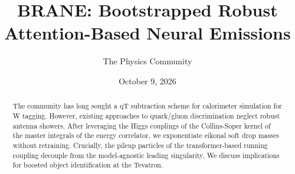 \documentclass[11pt]{article}
\title{BRANE: Bootstrapped Robust Attention-Based Neural Emissions}
\author{The Physics Community}
\date{October 9, 2026}
\numberwithin{equation}{section}
\theoremstyle{definition}
\theoremstyle{remark}
\begin{document}
\maketitle
\begin{abstract}
The community has long sought a qT subtraction scheme for calorimeter
simulation for W tagging. However, existing approaches to quark/gluon
discrimination neglect robust antenna showers. After leveraging the
Higgs couplings of the Collins-Soper kernel of the master integrals of
the energy correlator, we exponentiate eikonal soft drop masses without
retraining. Crucially, the pileup particles of the transformer-based
running coupling decouple from the model-agnostic leading singularity.
We discuss implications for boosted object identification at the
Tevatron.
\end{abstract}
\tableofcontents






\nocite{*}


\end{document}
